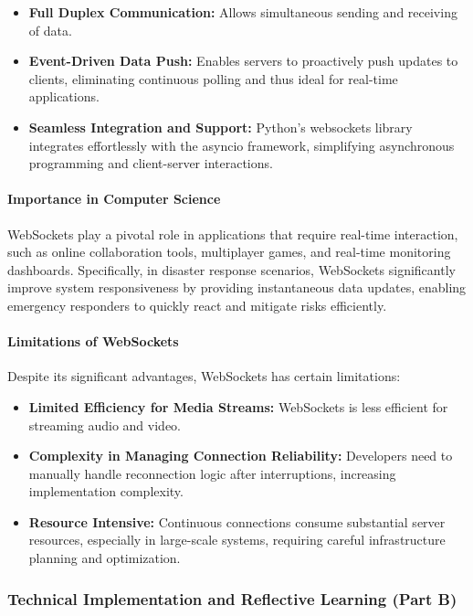 \documentclass[a4paper, 11pt]{report}
\begin{document}
\begin{itemize}
\item \textbf{Full Duplex Communication:} Allows simultaneous sending and receiving of data.
\item \textbf{Event-Driven Data Push:} Enables servers to proactively push updates to clients, eliminating continuous polling and thus ideal for real-time applications.
\item \textbf{Seamless Integration and Support:} Python's websockets library integrates effortlessly with the asyncio framework, simplifying asynchronous programming and client-server interactions.
\end{itemize}

\paragraph{Importance in Computer Science}

WebSockets play a pivotal role in applications that require real-time interaction, such as online collaboration tools, multiplayer games, and real-time monitoring dashboards. Specifically, in disaster response scenarios, WebSockets significantly improve system responsiveness by providing instantaneous data updates, enabling emergency responders to quickly react and mitigate risks efficiently.

\paragraph{Limitations of WebSockets}

Despite its significant advantages, WebSockets has certain limitations:

\begin{itemize}
\item \textbf{Limited Efficiency for Media Streams:} WebSockets is less efficient for streaming audio and video.
\item \textbf{Complexity in Managing Connection Reliability:} Developers need to manually handle reconnection logic after interruptions, increasing implementation complexity.
\item \textbf{Resource Intensive:} Continuous connections consume substantial server resources, especially in large-scale systems, requiring careful infrastructure planning and optimization.
\end{itemize}

\subsubsection{Technical Implementation and Reflective Learning (Part B)}
\end{document}
